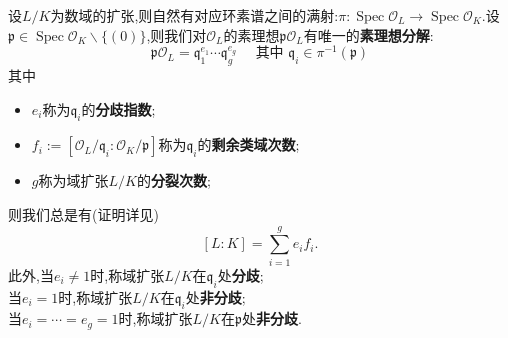 \documentclass[12pt,A4paper,oneside,reqno]{amsart}
\numberwithin{equation}{section}
\theoremstyle{definition}
\theoremstyle{plain}
\theoremstyle{plain}
\numberwithin{equation}{section}
\theoremstyle{remark}
\newcommand{\Spec}{\operatorname{Spec}}
\begin{document}
设$L/K$为数域的扩张,则自然有对应环素谱之间的满射:$\pi:\Spec \mathcal{O}_L \longrightarrow \Spec \mathcal{O}_K$.设$\mathfrak{p} \in \Spec \mathcal{O}_K\smallsetminus \{(0)\}$,则我们对$\mathcal{O}_L$的素理想$\mathfrak{p}\mathcal{O}_L$有唯一的\textbf{素理想分解}:
$$\mathfrak{p}\mathcal{O}_L = \mathfrak{q}_1^{e_1}\cdots\mathfrak{q}_g^{e_g} \quad\text{ 其中 } \mathfrak{q}_i \in \pi^{-1}(\mathfrak{p})$$
其中
\begin{itemize}
	\item $e_i$称为$\mathfrak{q}_i$的\textbf{分歧指数};
	\item $f_i:=[\mathcal{O}_L/\mathfrak{q}_i:\mathcal{O}_K/\mathfrak{p}]$称为$\mathfrak{q}_i$的\textbf{剩余类域次数};
	\item $g$称为域扩张$L/K$的\textbf{分裂次数};
\end{itemize}
则我们总是有(证明详见\cite[p46,定理2.5]{冯克勤2000代数数论})
\begin{equation}\label{eq:basicformulainan}
[L:K]=\sum_{i=1}^{g}e_if_i.
\end{equation}
此外,当$e_i\neq 1$时,称域扩张$L/K$在$\mathfrak{q}_i$处\textbf{分歧};\\
\phantom{此外,}当$e_i= 1$时,称域扩张$L/K$在$\mathfrak{q}_i$处\textbf{非分歧};\\
\phantom{此外,}当$e_i=\cdots =e_g= 1$时,称域扩张$L/K$在$\mathfrak{p}$处\textbf{非分歧}.
\end{document}
